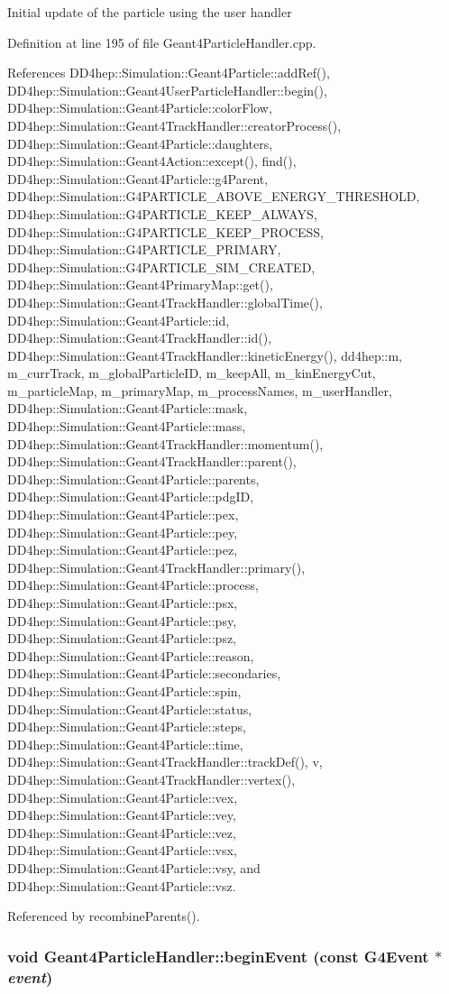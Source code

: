 Initial update of the particle using the user handler 

Definition at line 195 of file Geant4ParticleHandler.cpp.

References DD4hep::Simulation::Geant4Particle::addRef(), DD4hep::Simulation::Geant4UserParticleHandler::begin(), DD4hep::Simulation::Geant4Particle::colorFlow, DD4hep::Simulation::Geant4TrackHandler::creatorProcess(), DD4hep::Simulation::Geant4Particle::daughters, DD4hep::Simulation::Geant4Action::except(), find(), DD4hep::Simulation::Geant4Particle::g4Parent, DD4hep::Simulation::G4PARTICLE\_\-ABOVE\_\-ENERGY\_\-THRESHOLD, DD4hep::Simulation::G4PARTICLE\_\-KEEP\_\-ALWAYS, DD4hep::Simulation::G4PARTICLE\_\-KEEP\_\-PROCESS, DD4hep::Simulation::G4PARTICLE\_\-PRIMARY, DD4hep::Simulation::G4PARTICLE\_\-SIM\_\-CREATED, DD4hep::Simulation::Geant4PrimaryMap::get(), DD4hep::Simulation::Geant4TrackHandler::globalTime(), DD4hep::Simulation::Geant4Particle::id, DD4hep::Simulation::Geant4TrackHandler::id(), DD4hep::Simulation::Geant4TrackHandler::kineticEnergy(), dd4hep::m, m\_\-currTrack, m\_\-globalParticleID, m\_\-keepAll, m\_\-kinEnergyCut, m\_\-particleMap, m\_\-primaryMap, m\_\-processNames, m\_\-userHandler, DD4hep::Simulation::Geant4Particle::mask, DD4hep::Simulation::Geant4Particle::mass, DD4hep::Simulation::Geant4TrackHandler::momentum(), DD4hep::Simulation::Geant4TrackHandler::parent(), DD4hep::Simulation::Geant4Particle::parents, DD4hep::Simulation::Geant4Particle::pdgID, DD4hep::Simulation::Geant4Particle::pex, DD4hep::Simulation::Geant4Particle::pey, DD4hep::Simulation::Geant4Particle::pez, DD4hep::Simulation::Geant4TrackHandler::primary(), DD4hep::Simulation::Geant4Particle::process, DD4hep::Simulation::Geant4Particle::psx, DD4hep::Simulation::Geant4Particle::psy, DD4hep::Simulation::Geant4Particle::psz, DD4hep::Simulation::Geant4Particle::reason, DD4hep::Simulation::Geant4Particle::secondaries, DD4hep::Simulation::Geant4Particle::spin, DD4hep::Simulation::Geant4Particle::status, DD4hep::Simulation::Geant4Particle::steps, DD4hep::Simulation::Geant4Particle::time, DD4hep::Simulation::Geant4TrackHandler::trackDef(), v, DD4hep::Simulation::Geant4TrackHandler::vertex(), DD4hep::Simulation::Geant4Particle::vex, DD4hep::Simulation::Geant4Particle::vey, DD4hep::Simulation::Geant4Particle::vez, DD4hep::Simulation::Geant4Particle::vsx, DD4hep::Simulation::Geant4Particle::vsy, and DD4hep::Simulation::Geant4Particle::vsz.

Referenced by recombineParents().\hypertarget{class_d_d4hep_1_1_simulation_1_1_geant4_particle_handler_adfcc944cca3597fac178ccebbc405a1f}{
\subsubsection[{beginEvent}]{\setlength{\rightskip}{0pt plus 5cm}void Geant4ParticleHandler::beginEvent (const G4Event $\ast$ {\em event})}}
\label{class_d_d4hep_1_1_simulation_1_1_geant4_particle_handler_adfcc944cca3597fac178ccebbc405a1f}


